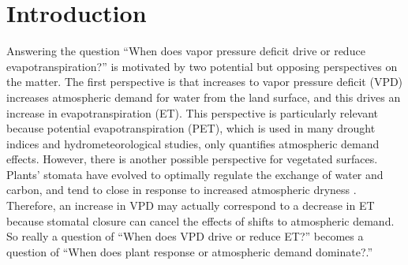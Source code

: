 \documentclass[draft,linenumbers]{agujournal}
\begin{document}

%
% 
% 
% 


\section{Introduction}


Answering the question ``When does vapor pressure deficit drive or reduce evapotranspiration?'' is motivated by two potential but opposing perspectives on the matter. The first perspective is that increases to vapor pressure deficit (VPD) increases atmospheric demand for water from the land surface, and this drives an increase in evapotranspiration (ET). This perspective is particularly relevant because potential evapotranspiration (PET), which is used in many drought indices and hydrometeorological studies, only quantifies atmospheric demand effects. However, there is another possible perspective for vegetated surfaces. Plants' stomata have evolved to optimally regulate the exchange of water and carbon, and tend to close in response to increased atmospheric dryness \citep{Ball_1987, Leuning_1990, MEDLYN_2011}.  Therefore, an increase in VPD may actually correspond to a decrease in ET because stomatal closure can cancel the effects of shifts to atmospheric demand. So really a question of ``When does VPD drive or reduce ET?'' becomes a question of ``When does plant response or atmospheric demand dominate?.''
\end{document}
